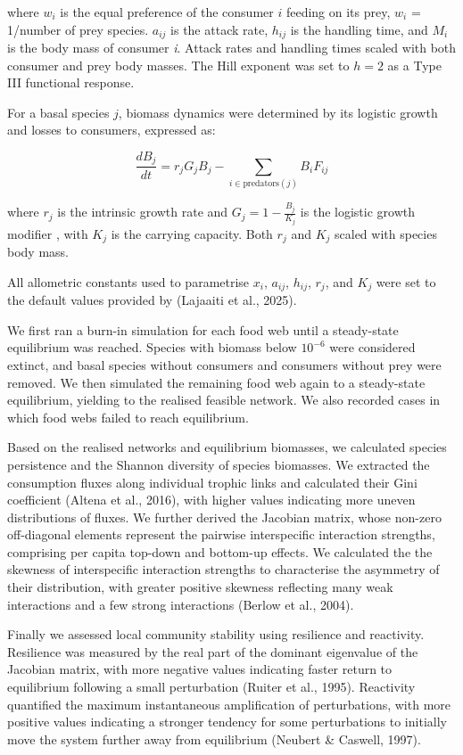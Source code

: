 \documentclass[
]{article}
\begin{document}
where \(w_i\) is the equal preference of the consumer \(i\) feeding on
its prey, \(w_i\) = 1/number of prey species. \(a_{ij}\) is the attack
rate, \(h_{ij}\) is the handling time, and \(M_i\) is the body mass of
consumer \emph{i}. Attack rates and handling times scaled with both
consumer and prey body masses. The Hill exponent was set to \(h = 2\) as
a Type III functional response.

For a basal species \(j\), biomass dynamics were determined by its
logistic growth and losses to consumers, expressed as:

\[\frac{dB_j}{dt} = r_j G_j B_j - \sum_{i \in \mathrm{predators}(j)} B_i F_{ij}\]

where \(r_j\) is the intrinsic growth rate and
\(G_j = 1 - \frac{B_j}{K_j}\) is the logistic growth modifier , with
\(K_j\) is the carrying capacity. Both \(r_j\) and \(K_j\) scaled with
species body mass.

All allometric constants used to parametrise \(x_i\), \(a_{ij}\),
\(h_{ij}\), \(r_j\), and \(K_j\) were set to the default values provided
by (Lajaaiti et al., 2025).

We first ran a burn-in simulation for each food web until a steady-state
equilibrium was reached. Species with biomass below \(10^{-6}\) were
considered extinct, and basal species without consumers and consumers
without prey were removed. We then simulated the remaining food web
again to a steady-state equilibrium, yielding to the realised feasible
network. We also recorded cases in which food webs failed to reach
equilibrium.

Based on the realised networks and equilibrium biomasses, we calculated
species persistence and the Shannon diversity of species biomasses. We
extracted the consumption fluxes along individual trophic links and
calculated their Gini coefficient (Altena et al., 2016), with higher
values indicating more uneven distributions of fluxes. We further
derived the Jacobian matrix, whose non-zero off-diagonal elements
represent the pairwise interspecific interaction strengths, comprising
per capita top-down and bottom-up effects. We calculated the the
skewness of interspecific interaction strengths to characterise the
asymmetry of their distribution, with greater positive skewness
reflecting many weak interactions and a few strong interactions (Berlow
et al., 2004).

Finally we assessed local community stability using resilience and
reactivity. Resilience was measured by the real part of the dominant
eigenvalue of the Jacobian matrix, with more negative values indicating
faster return to equilibrium following a small perturbation (Ruiter et
al., 1995). Reactivity quantified the maximum instantaneous
amplification of perturbations, with more positive values indicating a
stronger tendency for some perturbations to initially move the system
further away from equilibrium (Neubert \& Caswell, 1997).
\end{document}
